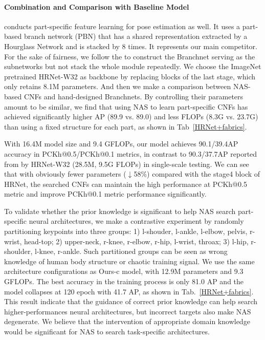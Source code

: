 \documentclass[journal]{IEEEtran}
\begin{document}
  \paragraph{Combination and Comparison with Baseline Model}
  \cite{Tang_2019_CVPR} conducts part-specific feature learning for pose estimation as well. It uses a part-based branch network (PBN) that has a shared representation extracted by a Hourglass Network and is stacked by 8 times. It represents our main competitor. For the sake of fairness, we follow the \cite{Tang_2019_CVPR} to construct the Branchnet serving as the subnetworks  but not stack the whole module repeatedly. We choose the ImageNet pretrained HRNet-W32 \cite{Sun_2019_CVPR} as backbone by replacing blocks of the last stage, which only retains 8.1M parameters. And then we make a comparison between NAS-based CNFs and hand-designed Branchnets. By controlling their parameters amount to be similar, we find that using NAS to learn part-specific CNFs has achieved significantly higher AP (89.9 vs. 89.0) and less FLOPs (8.3G vs. 23.7G) than using a fixed structure for each part, as shown in Tab~\ref{HRNet+fabrics}. 
  
  With 16.4M model size and 9.4 GFLOPs, our model achieves 90.1/39.4AP accuracy in PCKh@0.5/PCKh@0.1 metrics, in contrast to 90.3/37.7AP reported from \cite{Sun_2019_CVPR} by HRNet-W32 (28.5M, 9.5G FLOPs) in single-scale testing. We can see that with obviously fewer parameters ($\downarrow$58\%) compared with the stage4 block of HRNet, the searched CNFs can maintain the high performance at PCKh@0.5 metric and improve PCKh@0.1 metric performance significantly.
  
  To validate whether the prior knowledge is significant to help NAS search part-specific neural architectures, we make a contrastive experiment by randomly partitioning keypoints into three groups: 1) l-shouder, l-ankle, l-elbow, pelvis, r-wrist, head-top; 2) upper-neck, r-knee, r-elbow, r-hip, l-wrist, throax; 3) l-hip, r-shoulder, l-knee, r-ankle. Such partitioned groups can be seen as wrong knowledge of human body structure or chaotic training signal. We use the same architecture configurations as Ours-c model, with 12.9M parameters and 9.3 GFLOPs. The best accuracy in the training process is only 81.0 AP and the model collapses at 120 epoch with 41.7 AP, as shown in Tab.~\ref{HRNet+fabrics}. This result indicate that the guidance of correct prior knowledge can help search higher-performances neural architectures, but incorrect targets also make NAS degenerate. We believe that the intervention of appropriate domain knowledge would be significant for NAS to search task-specific architectures.
  
\end{document}
